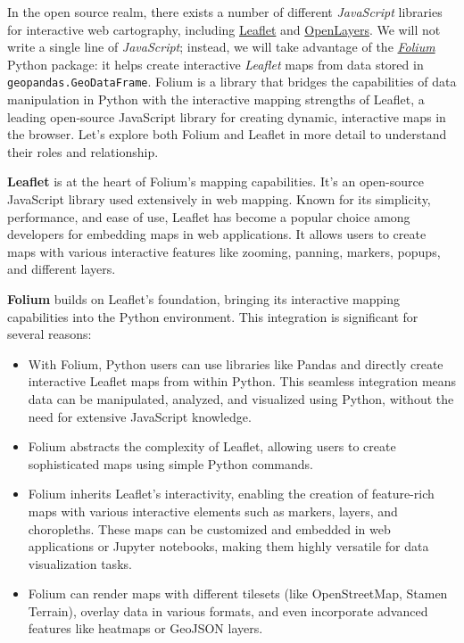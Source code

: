 \documentclass[
  letterpaper,
  DIV=11,
  numbers=noendperiod]{scrreprt}
\providecommand{\tightlist}{%
  \setlength{\itemsep}{0pt}\setlength{\parskip}{0pt}}\usepackage{longtable,booktabs,array}
\begin{document}
In the open source realm, there exists a number of different
\emph{JavaScript} libraries for interactive web cartography, including
\href{https://leafletjs.com/}{Leaflet} and
\href{https://openlayers.org/}{OpenLayers}. We will not write a single
line of \emph{JavaScript}; instead, we will take advantage of the
\href{https://python-visualization.github.io/folium/}{\emph{Folium}}
Python package: it helps create interactive \emph{Leaflet} maps from
data stored in \texttt{geopandas.GeoDataFrame}. Folium is a library that
bridges the capabilities of data manipulation in Python with the
interactive mapping strengths of Leaflet, a leading open-source
JavaScript library for creating dynamic, interactive maps in the
browser. Let's explore both Folium and Leaflet in more detail to
understand their roles and relationship.

\textbf{Leaflet} is at the heart of Folium's mapping capabilities. It's
an open-source JavaScript library used extensively in web mapping. Known
for its simplicity, performance, and ease of use, Leaflet has become a
popular choice among developers for embedding maps in web applications.
It allows users to create maps with various interactive features like
zooming, panning, markers, popups, and different layers.

\textbf{Folium} builds on Leaflet's foundation, bringing its interactive
mapping capabilities into the Python environment. This integration is
significant for several reasons:

\begin{itemize}
\tightlist
\item
  With Folium, Python users can use libraries like Pandas and directly
  create interactive Leaflet maps from within Python. This seamless
  integration means data can be manipulated, analyzed, and visualized
  using Python, without the need for extensive JavaScript knowledge.
\item
  Folium abstracts the complexity of Leaflet, allowing users to create
  sophisticated maps using simple Python commands.
\item
  Folium inherits Leaflet's interactivity, enabling the creation of
  feature-rich maps with various interactive elements such as markers,
  layers, and choropleths. These maps can be customized and embedded in
  web applications or Jupyter notebooks, making them highly versatile
  for data visualization tasks.
\item
  Folium can render maps with different tilesets (like OpenStreetMap,
  Stamen Terrain), overlay data in various formats, and even incorporate
  advanced features like heatmaps or GeoJSON layers.
\end{itemize}
\end{document}
